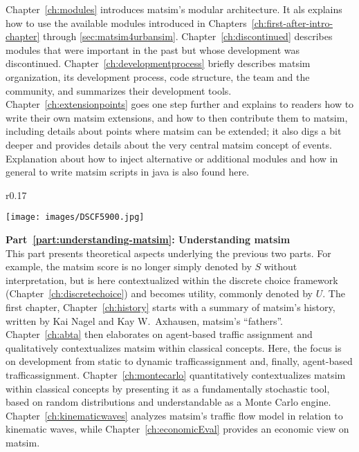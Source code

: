 Chapter~\ref{ch:modules} introduces \gls{matsim}'s modular architecture. It als explains how to use the available \glspl{module} introduced in Chapters~\ref{ch:first-after-intro-chapter} through \ref{sec:matsim4urbansim}. 
Chapter~\ref{ch:discontinued} describes modules that were important in the past but whose development was discontinued.
Chapter~\ref{ch:developmentprocess} briefly describes \gls{matsim} organization, \ie its development process, code structure, the team and the community, and summarizes their development tools. 
Chapter~\ref{ch:extensionpoints} goes one step further and explains to readers how to write their own \gls{matsim} \glspl{extension}, and how to then contribute them to \gls{matsim}, including details about points where \gls{matsim} can be extended; it also digs a bit deeper and provides details about the very central \gls{matsim} concept of \glspl{event}. Explanation about how to 
inject alternative or additional modules and 
how in general to write \gls{matsim} scripts in \gls{java} is also found here.

\begin{wrapfigure}[7]{r}{0.17\textwidth}
\vspace{-10pt}
  \begin{center}
    \texttt{[image: images/DSCF5900.jpg]}
  \end{center}
\end{wrapfigure}
\textbf{Part~\ref{part:understanding-matsim}: Understanding \acrshort{matsim}}\\
%
This part presents theoretical aspects underlying the previous two parts. For example, the \gls{matsim} \gls{score} is no longer simply denoted by $S$ without interpretation, but is here contextualized within the discrete choice framework (Chapter~\ref{ch:discretechoice}) and becomes \gls{utility}, commonly denoted by $U$. 
The first chapter, Chapter~\ref{ch:history} starts with a summary of \gls{matsim}'s history, written by Kai Nagel and Kay W.\ Axhausen, \gls{matsim}'s ``fathers''. 
Chapter~\ref{ch:abta} then elaborates on agent-based traffic assignment and qualitatively contextualizes \gls{matsim} within classical concepts. Here, the focus is on development from static to dynamic \gls{trafficassignment} and, finally, agent-based \gls{trafficassignment}.  
Chapter~\ref{ch:montecarlo} quantitatively contextualizes \gls{matsim} within classical concepts by presenting it as a fundamentally stochastic tool, based on random distributions and understandable as a Monte Carlo engine.
Chapter~\ref{ch:kinematicwaves} analyzes \gls{matsim}'s traffic flow model in relation to kinematic waves, while Chapter~\ref{ch:economicEval} provides an economic view on \gls{matsim}. 

